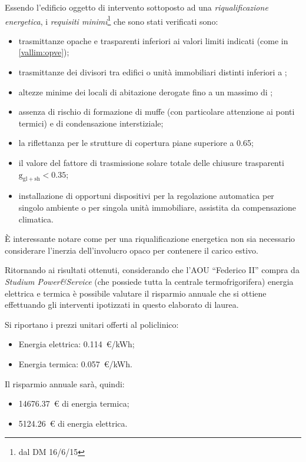 Essendo l'edificio oggetto di intervento sottoposto ad una \emph{riqualificazione energetica}, i \emph{requisiti minimi}\footnote{dal DM 16/6/15} che sono stati verificati sono:
\begin{itemize}
	\item trasmittanze opache e trasparenti inferiori ai valori limiti indicati (come in \vref{vallim:opve});
	\item trasmittanze dei divisori tra edifici o unità immobiliari distinti inferiori a ;
	\item altezze minime dei locali di abitazione derogate fino a un massimo di ;
	\item assenza di rischio di formazione di muffe (con particolare attenzione ai ponti termici) e di condensazione interstiziale;
	\item la riflettanza per le strutture di copertura piane superiore a \num{0.65};
	\item il valore del fattore di trasmissione solare totale delle chiusure trasparenti $\mathrm{g_{gl+sh}<0.35}$;
	\item installazione di opportuni dispositivi per la regolazione automatica per singolo ambiente o per singola unità immobiliare, assistita da compensazione climatica.
\end{itemize}
È interessante notare come per una riqualificazione energetica non sia necessario considerare l'inerzia dell'involucro opaco per contenere il carico estivo.

Ritornando ai risultati ottenuti, considerando che l'AOU ``Federico II'' compra da \emph{Studium Power\&Service} (che possiede tutta la centrale termofrigorifera) energia elettrica e termica è possibile valutare il risparmio annuale che si ottiene effettuando gli interventi ipotizzati in questo elaborato di laurea.

Si riportano i prezzi unitari offerti al policlinico: 
\begin{itemize}
	\item Energia elettrica: \num{0.114}\ \euro/kWh;
	\item Energia termica: \num{0.057}\ \euro/kWh.
\end{itemize}
Il risparmio annuale sarà, quindi:
\begin{itemize}
	\item \num{14676.37}\ \euro\- di energia termica; %
	\item \num{5124.26}\ \euro\- di energia elettrica.
\end{itemize}

